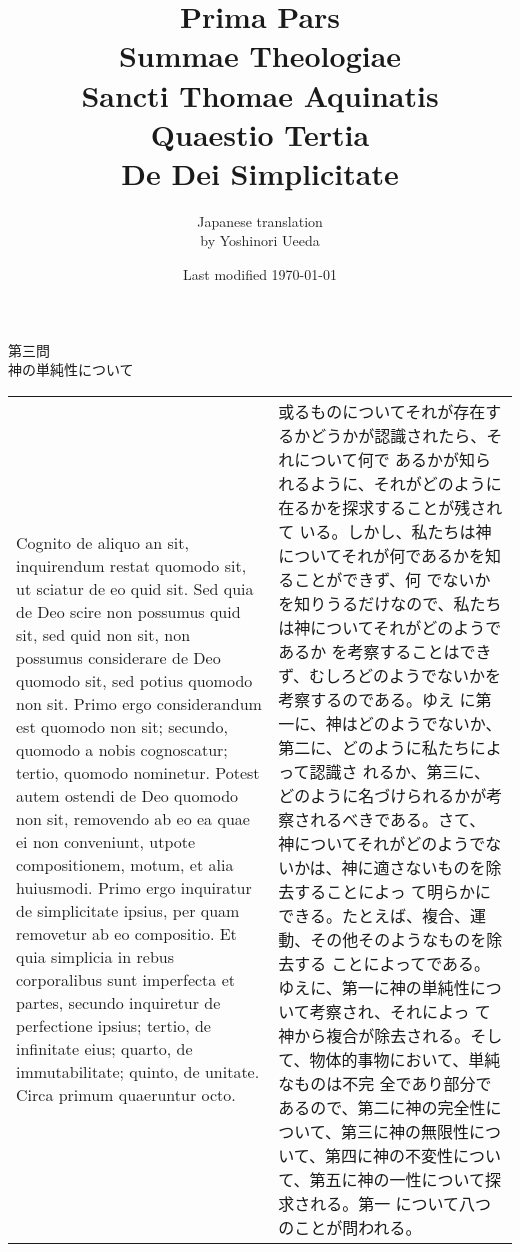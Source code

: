 \documentclass[10pt]{jsarticle}
\title{{\bf Prima Pars}\\{\HUGE Summae Theologiae}\\Sancti Thomae
Aquinatis\\Quaestio Tertia\\{\bf De Dei Simplicitate}}
\author{Japanese translation\\by Yoshinori {\sc Ueeda}}
\date{Last modified \today}
\begin{document}
\maketitle

\begin{center}
 {\Large 第三問\\神の単純性について}
\end{center}


\begin{longtable}{p{21em}p{21em}}

Cognito de aliquo an sit, inquirendum restat quomodo sit, ut sciatur de
eo quid sit. Sed quia de Deo scire non possumus quid sit, sed quid non
sit, non possumus considerare de Deo quomodo sit, sed potius quomodo non
sit. Primo ergo considerandum est quomodo non sit; secundo, quomodo a
nobis cognoscatur; tertio, quomodo nominetur. Potest autem ostendi de
Deo quomodo non sit, removendo ab eo ea quae ei non conveniunt, utpote
compositionem, motum, et alia huiusmodi. Primo ergo inquiratur de
simplicitate ipsius, per quam removetur ab eo compositio. Et quia
simplicia in rebus corporalibus sunt imperfecta et partes, secundo
inquiretur de perfectione ipsius; tertio, de infinitate eius; quarto, de
immutabilitate; quinto, de unitate. Circa primum quaeruntur octo. 


&

或るものについてそれが存在するかどうかが認識されたら、それについて何で
あるかが知られるように、それがどのように在るかを探求することが残されて
いる。しかし、私たちは神についてそれが何であるかを知ることができず、何
でないかを知りうるだけなので、私たちは神についてそれがどのようであるか
を考察することはできず、むしろどのようでないかを考察するのである。ゆえ
に第一に、神はどのようでないか、第二に、どのように私たちによって認識さ
れるか、第三に、どのように名づけられるかが考察されるべきである。さて、
神についてそれがどのようでないかは、神に適さないものを除去することによっ
て明らかにできる。たとえば、複合、運動、その他そのようなものを除去する
ことによってである。ゆえに、第一に神の単純性について考察され、それによっ
て神から複合が除去される。そして、物体的事物において、単純なものは不完
全であり部分であるので、第二に神の完全性について、第三に神の無限性につ
いて、第四に神の不変性について、第五に神の一性について探求される。第一
について八つのことが問われる。

\\


\end{longtable}
\end{document}
